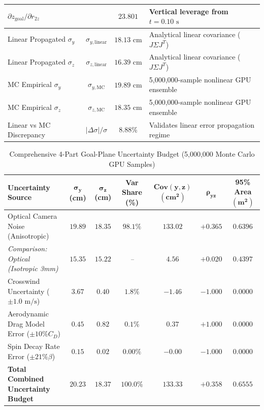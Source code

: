 \begin{table}[htbp]
\begin{tabular}{lccl}
$\partial z_{\text{goal}} / \partial r_{2z}$ & & $23.801$ & Vertical leverage from $t = 0.10\text{ s}$ \\
\midrule
Linear Propagated $\sigma_y$ & $\sigma_{y,\text{linear}}$ & $18.13\text{ cm}$ & Analytical linear covariance ($J \Sigma J^T$) \\
Linear Propagated $\sigma_z$ & $\sigma_{z,\text{linear}}$ & $16.39\text{ cm}$ & Analytical linear covariance ($J \Sigma J^T$) \\
MC Empirical $\sigma_y$ & $\sigma_{y,\text{MC}}$ & $19.89\text{ cm}$ & 5,000,000-sample nonlinear GPU ensemble \\
MC Empirical $\sigma_z$ & $\sigma_{z,\text{MC}}$ & $18.35\text{ cm}$ & 5,000,000-sample nonlinear GPU ensemble \\
Linear vs MC Discrepancy & $|\Delta \sigma| / \sigma$ & $8.88\%$ & Validates linear error propagation regime \\
\bottomrule
\end{tabular}
\end{table}

\begin{table}[htbp]
\centering
\caption{Comprehensive 4-Part Goal-Plane Uncertainty Budget (5,000,000 Monte Carlo GPU Samples)}
\label{tab:uncertainty_budget}
\begin{tabular}{lcccccc}
\toprule
\textbf{Uncertainty Source} & $\mathbf{\sigma_y}$ \textbf{(cm)} & $\mathbf{\sigma_z}$ \textbf{(cm)} & \textbf{Var Share (\%)} & $\mathbf{\text{Cov}(y,z)}$ $\mathbf{(\text{cm}^2)}$ & $\mathbf{\rho_{yz}}$ & \textbf{95\% Area} $\mathbf{(\text{m}^2)}$ \\
\midrule
Optical Camera Noise (Anisotropic) & $19.89$ & $18.35$ & $98.1\%$ & $133.02$ & $+0.365$ & $0.6396$ \\
\quad \textit{Comparison: Optical (Isotropic 3mm)} & $15.35$ & $15.22$ & \textit{--} & $4.56$ & $+0.020$ & $0.4397$ \\
Crosswind Uncertainty ($\pm 1.0\text{ m/s}$) & $3.67$ & $0.40$ & $1.8\%$ & $-1.46$ & $-1.000$ & $0.0000$ \\
Aerodynamic Drag Model Error ($\pm 10\% C_D$) & $0.45$ & $0.82$ & $0.1\%$ & $0.37$ & $+1.000$ & $0.0000$ \\
Spin Decay Rate Error ($\pm 21\% \beta$) & $0.15$ & $0.02$ & $0.00\%$ & $-0.00$ & $-1.000$ & $0.0000$ \\
\midrule
\textbf{Total Combined Uncertainty Budget} & $\mathbf{20.23}$ & $\mathbf{18.37}$ & $\mathbf{100.0\%}$ & $\mathbf{133.33}$ & $\mathbf{+0.358}$ & $\mathbf{0.6555}$ \\
\bottomrule
\end{tabular}
\end{table}

